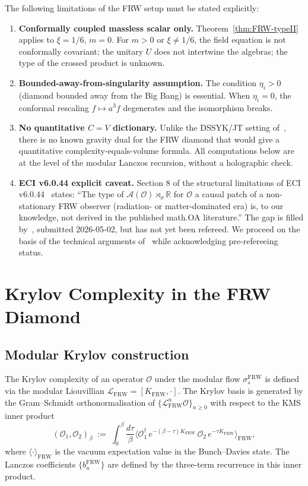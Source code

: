 \documentclass[12pt,a4paper]{article}
\theoremstyle{definition}
\newcommand{\FRW}{\mathrm{FRW}}
\begin{document}
The following limitations of the FRW setup must be stated explicitly:
\begin{enumerate}
\item \textbf{Conformally coupled massless scalar only.}
  Theorem~\ref{thm:FRW-typeII} applies to $\xi = 1/6$, $m = 0$.
  For $m > 0$ or $\xi \ne 1/6$, the field equation is not conformally
  covariant; the unitary $U$ does not intertwine the algebras; the
  type of the crossed product is unknown.
\item \textbf{Bounded-away-from-singularity assumption.}
  The condition $\eta_i > 0$ (diamond bounded away from the Big Bang)
  is essential. When $\eta_i = 0$, the conformal rescaling $f \mapsto a^3 f$
  degenerates and the isomorphism breaks.
\item \textbf{No quantitative $C = V$ dictionary.}
  Unlike the DSSYK/JT setting of~\cite{HPS2024}, there is no known
  gravity dual for the FRW diamond that would give a quantitative
  complexity-equals-volume formula. All computations below are at the
  level of the modular Lanczos recursion, without a holographic check.
\item \textbf{ECI v6.0.44 explicit caveat.}
  Section 8 of the structural limitations of ECI v6.0.44~\cite{ECI_v6}
  states: ``The type of $\mathcal{A}(\mathcal{O}) \rtimes_\sigma \mathbb{R}$
  for $\mathcal{O}$ a causal patch of a non-stationary FRW observer
  (radiation- or matter-dominated era) is, to our knowledge, not derived
  in the published math.OA literature.''
  The gap is filled by~\cite{FRWnote}, submitted 2026-05-02, but has
  not yet been refereed. We proceed on the basis of the technical
  arguments of~\cite{FRWnote} while acknowledging pre-refereeing status.
\end{enumerate}

\section{Krylov Complexity in the FRW Diamond}
\label{sec:krylov-FRW}

\subsection{Modular Krylov construction}

The Krylov complexity of an operator $\mathcal{O}$ under the modular flow
$\sigma_s^\FRW$ is defined via the modular Liouvillian
$\mathcal{L}_\FRW = [K_\FRW, \cdot]$.
The Krylov basis is generated by the Gram--Schmidt orthonormalisation
of $\{\mathcal{L}_\FRW^n \mathcal{O}\}_{n \ge 0}$ with respect to the
KMS inner product
\begin{equation}
  (\mathcal{O}_1, \mathcal{O}_2)_\beta
  \;:=\; \int_0^\beta \frac{d\tau}{\beta}
  \langle \mathcal{O}_1^\dagger\,
  e^{-(\beta-\tau) K_\FRW}\,\mathcal{O}_2\,
  e^{-\tau K_\FRW}\rangle_\FRW,
  \label{eq:KMS-inner-product}
\end{equation}
where $\langle \cdot \rangle_\FRW$ is the vacuum expectation value in
the Bunch--Davies state.
The Lanczos coefficients $\{b_n^\FRW\}$ are defined by the three-term
recurrence in this inner product.
\end{document}
